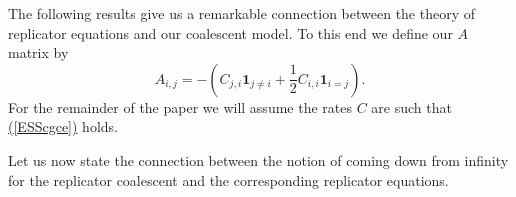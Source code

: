 \documentclass[12pt, leqno]{article}
\newtheorem{lemma}{Lemma}
\renewcommand{\eqref}[1]{\hyperref[#1]{(\ref*{#1})}}
\begin{document}
\medskip




The following results give us a remarkable connection between  the theory of replicator equations and  our coalescent model. To this end we define our $A$ matrix by
\begin{equation}
A_{i,j} = -\left(C_{j,i} \mathbf{1}_{j\neq i} + \frac{1}{2} C_{i,i}\mathbf{1}_{i=j}\right).
\label{A}
\end{equation}
For the remainder of the paper we will assume the rates $C$ are such that \eqref{ESScgce} holds. 

%
\medskip

Let us now state the connection between the notion of coming down from infinity for the replicator coalescent and the corresponding replicator equations.
\end{document}
